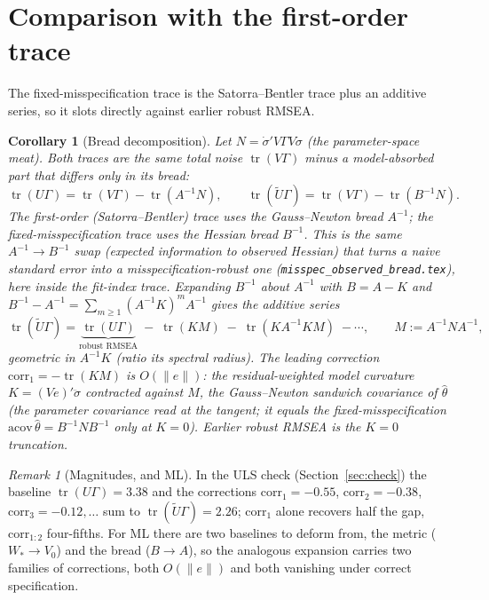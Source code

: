 \documentclass[11pt]{article}
\newcommand{\tr}{\operatorname{tr}}
\theoremstyle{plain}
\newtheorem{corollary}{Corollary}
\theoremstyle{remark}
\newtheorem*{remark}{Remark}
\begin{document}
\section{Comparison with the first-order trace}

The fixed-misspecification trace is the Satorra--Bentler trace plus an additive
series, so it slots directly against earlier robust RMSEA.

\begin{corollary}[Bread decomposition]\label{cor:decomp}
Let $N=\dot\sigma'V\Gamma V\dot\sigma$ (the parameter-space meat). Both traces are
the same total noise $\tr(V\Gamma)$ minus a model-absorbed part that differs only
in its bread:
\begin{equation}\label{eq:breadforms}
  \tr(U\Gamma)=\tr(V\Gamma)-\tr(A^{-1}N),
  \qquad
  \tr(\tilde U\Gamma)=\tr(V\Gamma)-\tr(B^{-1}N).
\end{equation}
The first-order (Satorra--Bentler) trace uses the Gauss--Newton bread $A^{-1}$;
the fixed-misspecification trace uses the Hessian bread $B^{-1}$. This is the same
$A^{-1}\!\to\!B^{-1}$ swap (expected information to observed Hessian) that turns a
naive standard error into a misspecification-robust one
(\texttt{misspec\_observed\_bread.tex}), here inside the fit-index trace.
Expanding $B^{-1}$ about $A^{-1}$ with $B=A-K$ and
$B^{-1}-A^{-1}=\sum_{m\ge1}(A^{-1}K)^mA^{-1}$ gives the additive series
\begin{equation}\label{eq:decompseries}
  \tr(\tilde U\Gamma)=\underbrace{\tr(U\Gamma)}_{\text{robust RMSEA}}
  \;-\;\tr(KM)\;-\;\tr(KA^{-1}KM)\;-\cdots,
  \qquad M:=A^{-1}NA^{-1},
\end{equation}
geometric in $A^{-1}K$ (ratio its spectral radius). The leading correction
$\mathrm{corr}_1=-\tr(KM)$ is $O(\|e\|)$: the residual-weighted model curvature
$K=(Ve)'\ddot\sigma$ contracted against $M$, the Gauss--Newton sandwich
covariance of $\hat\theta$ (the parameter covariance read at the tangent; it
equals the fixed-misspecification $\mathrm{acov}\,\hat\theta=B^{-1}NB^{-1}$ only
at $K=0$). Earlier robust RMSEA is the $K=0$ truncation.
\end{corollary}

\begin{remark}[Magnitudes, and ML]
In the ULS check (Section~\ref{sec:check}) the baseline $\tr(U\Gamma)=3.38$ and
the corrections $\mathrm{corr}_1=-0.55$, $\mathrm{corr}_2=-0.38$,
$\mathrm{corr}_3=-0.12,\dots$ sum to $\tr(\tilde U\Gamma)=2.26$; $\mathrm{corr}_1$
alone recovers half the gap, $\mathrm{corr}_{1:2}$ four-fifths. For ML there are
two baselines to deform from, the metric ($W_\ast\!\to\!V_0$) and the bread
($B\!\to\!A$), so the analogous expansion carries two families of corrections,
both $O(\|e\|)$ and both vanishing under correct specification.
\end{remark}
\end{document}
